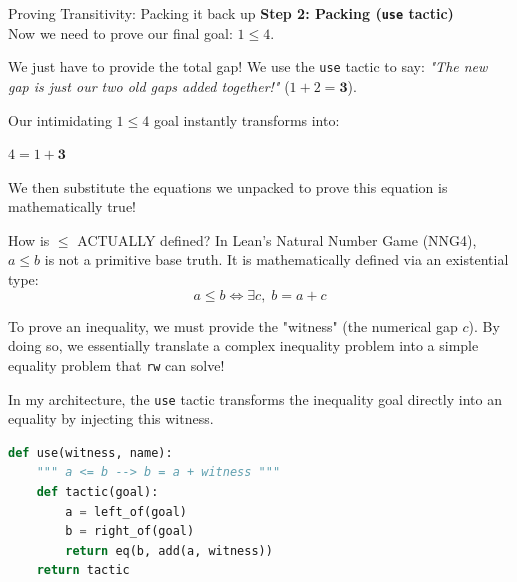 \documentclass[aspectratio=169, 10pt]{beamer}
\begin{document}
\begin{frame}[fragile]{Proving Transitivity: Packing it back up}
    \textbf{Step 2: Packing (\texttt{use} tactic)} \\
    Now we need to prove our final goal: $1 \le 4$.
    
    We just have to provide the total gap! We use the \texttt{use} tactic to say: \textit{"The new gap is just our two old gaps added together!"} ($1 + 2 = \mathbf{3}$).
    
    \vspace{1em}
    Our intimidating $1 \le 4$ goal instantly transforms into:
    \begin{center}
        \Large $4 = 1 + \mathbf{3}$
    \end{center}
    
    We then substitute the equations we unpacked to prove this equation is mathematically true!
\end{frame}

\begin{frame}[fragile]{How is $\le$ ACTUALLY defined?}
    In Lean's Natural Number Game (NNG4), $a \le b$ is not a primitive base truth. It is mathematically defined via an existential type:
    \begin{equation*}
        a \le b \iff \exists c, \; b = a + c
    \end{equation*}

    To prove an inequality, we must provide the "witness" (the numerical gap $c$). By doing so, we essentially translate a complex inequality problem into a simple equality problem that \texttt{rw} can solve!

    In my architecture, the \texttt{use} tactic transforms the inequality goal directly into an equality by injecting this witness.

\begin{lstlisting}[language=Python]
def use(witness, name):
    """ a <= b --> b = a + witness """
    def tactic(goal):
        a = left_of(goal)
        b = right_of(goal)
        return eq(b, add(a, witness))
    return tactic
\end{lstlisting}
\end{frame}
\end{document}
